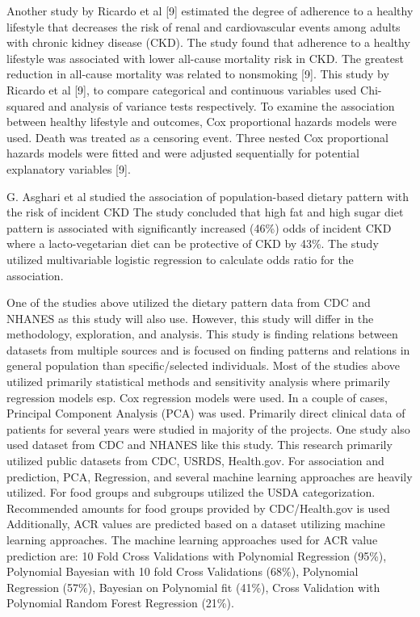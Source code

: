 \medskip
\noindent Another study by Ricardo et al [9] estimated the degree of adherence to a healthy lifestyle that decreases the risk of renal and cardiovascular events among adults with chronic kidney disease (CKD). The study found that adherence to a healthy lifestyle was associated with lower all-cause mortality risk in CKD. The greatest reduction in all-cause mortality was related to nonsmoking [9]. This study by Ricardo et al [9], to compare categorical and continuous variables used Chi-squared and analysis of variance tests respectively. To examine the association between healthy lifestyle and outcomes, Cox proportional hazards models were used. Death was treated as a censoring event. Three nested Cox proportional hazards models were fitted and were adjusted sequentially for potential explanatory variables [9].

\medskip
\noindent G. Asghari et al studied the association of population-based dietary pattern with the risk of incident CKD The study concluded that high fat and high sugar diet pattern is associated with significantly increased (46\%) odds of incident CKD where a lacto-vegetarian diet can be protective of CKD by 43\%. The study utilized multivariable logistic regression to calculate odds ratio for the association.

\medskip
\noindent  One of the studies above utilized the dietary pattern data from CDC and NHANES as this study will also use. However, this study will differ in the methodology, exploration, and analysis. This study is finding relations between datasets from multiple sources and is focused on finding patterns and relations in general population than specific/selected individuals. Most of the studies above utilized primarily statistical methods and sensitivity analysis where primarily regression models esp. Cox regression models were used. In a couple of
cases, Principal Component Analysis (PCA) was used. Primarily direct clinical data of patients for several years were studied in majority of the projects.  One study also used dataset from CDC and NHANES like this study. This research primarily utilized public datasets from CDC, USRDS, Health.gov. For association and prediction, PCA, Regression, and several machine learning approaches are heavily utilized. For food groups and subgroups  utilized the USDA categorization. Recommended amounts for food groups provided by CDC/Health.gov is used
Additionally, ACR values are predicted based on a dataset utilizing machine learning approaches.  The machine learning approaches used for ACR value prediction are: 10 Fold Cross Validations with Polynomial Regression (95\%), Polynomial Bayesian with 10 fold Cross Validations (68\%), Polynomial Regression (57\%), Bayesian on Polynomial fit (41\%), Cross Validation with Polynomial Random Forest Regression (21\%).